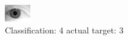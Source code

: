 \begin{figure}[h!]
\begin{center}
\includegraphics[width=0.60\columnwidth]{figures/ID2087_class_4_target_3.png}
\end{center}
\caption{ Classification: 4 actual target: 3}
\label{fig:ID2087_class_4_target_3}
\end{figure}
